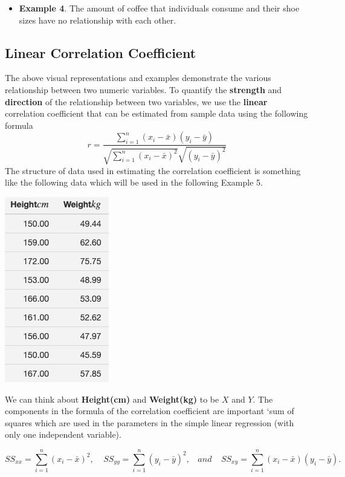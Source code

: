 \documentclass[
]{book}
\providecommand{\tightlist}{%
  \setlength{\itemsep}{0pt}\setlength{\parskip}{0pt}}
\begin{document}
\begin{itemize}
\tightlist
\item
  \textbf{Example 4}. The amount of coffee that individuals consume and their shoe sizes have no relationship with each other.\\
\end{itemize}

\hfill\break

\hypertarget{linear-correlation-coefficient}{%
\subsection{Linear Correlation Coefficient}\label{linear-correlation-coefficient}}

\hfill\break
The above visual representations and examples demonstrate the various relationship between two numeric variables. To quantify the \textbf{strength} and \textbf{direction} of the relationship between two variables, we use the \textbf{linear} correlation coefficient that can be estimated from sample data using the following formula
\[
r = \frac{\sum_{i=1}^n(x_i-\bar{x})(y_i-\bar{y})}{\sqrt{\sum_{i=1}^n(x_i-\bar{x})^2}\sqrt{(y_i-\bar{y})^2}}
\]
The structure of data used in estimating the correlation coefficient is something like the following data which will be used in the following Example 5.

\begin{center}\includegraphics[width=0.2\linewidth]{week12/correlationData} \end{center}

We can think about \textbf{Height(cm)} and \textbf{Weight(kg)} to be \(X\) and \(Y\). The components in the formula of the correlation coefficient are important `sum of squares which are used in the parameters in the simple linear regression (with only one independent variable).

\[
SS_{xx} = \sum_{i=1}^n(x_i-\bar{x})^2, \ \  \  \  \ SS_{yy} = \sum_{i=1}^n(y_i-\bar{y})^2, \ \ \ \ and \  \  \  \  \   SS_{xy} = \sum_{i=1}^n(x_i-\bar{x})(y_i-\bar{y}). 
\]
\end{document}
